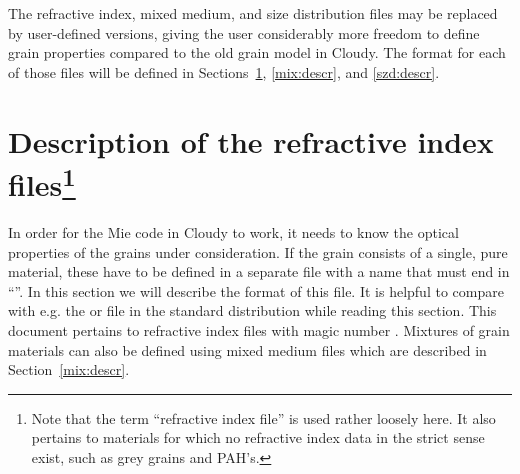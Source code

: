 The refractive index, mixed medium, and size distribution files may be
replaced by user-defined versions, giving the user considerably more freedom
to define grain properties compared to the old grain model in Cloudy. The
format for each of those files will be defined in Sections~\ref{rfi:descr},
\ref{mix:descr}, and \ref{szd:descr}.

\section[Description of the refractive index files]
{Description of the refractive index files\protect\footnote{Note that the
term ``refractive index file'' is used rather loosely here. It also pertains
to materials for which no refractive index data in the strict sense exist,
such as grey grains and PAH's.}}
\label{rfi:descr}

In order for the Mie code in Cloudy to work, it needs to know the optical
properties of the grains under consideration. If the grain consists of a
single, pure material, these have to be defined in a separate file with a name
that must end in ``''. In this section we will describe the
format of this file. It is helpful to compare with e.g. the
 or  file in the standard
distribution while reading this section. This document pertains to refractive
index files with magic number . Mixtures of grain
materials can also be defined using mixed medium files which are described in
Section~\ref{mix:descr}.

